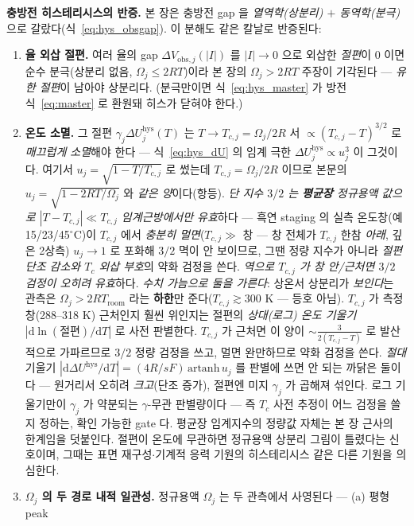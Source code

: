 \documentclass[11pt,a4paper]{article}
\newcommand{\dd}{\mathrm{d}}
\newcommand{\hys}{\mathrm{hys}}
\begin{document}
\textbf{충방전 히스테리시스의 반증.} 본 장은 충방전 gap 을 \emph{열역학(상분리) $+$ 동역학(분극)}으로
갈랐다(식~\eqref{eq:hys_obsgap}). 이 분해도 같은 칼날로 반증된다:
\begin{enumerate}[label=(\roman*),leftmargin=2.0em,itemsep=2pt]
\item \textbf{율 외삽 절편.} 여러 율의 gap $\Delta V_{\mathrm{obs},j}(|I|)$ 를 $|I|\to0$ 으로 외삽한 \emph{절편}이 $0$ 이면
  순수 분극(상분리 없음, $\Omega_j\le2RT$)이라 본 장의 $\Omega_j>2RT$ 주장이 기각된다 — \emph{유한 절편}이 남아야
  상분리다. (분극만이면 식~\eqref{eq:hys_master} 가 방전식~\eqref{eq:master} 로 환원돼 히스가 닫혀야 한다.)
\item \textbf{온도 소멸.} 그 절편 $\gamma_j\Delta U_j^\hys(T)$ 는 $T\to T_{c,j}=\Omega_j/2R$ 서
  $\propto(T_{c,j}-T)^{3/2}$ 로 \emph{매끄럽게 소멸}해야 한다 — 식~\eqref{eq:hys_dU} 의 임계 극한
  $\Delta U_j^\hys\!\propto\!u_j^3$ 이 그것이다. 여기서 $u_j=\sqrt{1-T/T_{c,j}}$ 로 썼는데 $T_{c,j}=\Omega_j/2R$
  이므로 본문의 $u_j=\sqrt{1-2RT/\Omega_j}$ 와 \emph{같은 양}이다(항등). \emph{단 지수 $3/2$ 는 \textbf{평균장} 정규용액 값으로
  $|T-T_{c,j}|\ll T_{c,j}$ 임계근방에서만 유효}하다 — 흑연 staging 의 실측 온도창(예 15/23/45$^\circ$C)이 $T_{c,j}$ 에서
  \emph{충분히 멀면}($T_{c,j}\gg$ 창 — 창 전체가 $T_{c,j}$ 한참 \emph{아래}, 깊은 2상측) $u_j\to1$ 로 포화해 $3/2$ 멱이 안 보이므로, 그땐 정량 지수가 아니라
  \emph{절편 단조 감소와 $T_c$ 외삽 부호}의 약화 검정을 쓴다. \emph{역으로 $T_{c,j}$ 가 창 \emph{안/근처}면 $3/2$ 검정이
  오히려 유효}하다. \emph{수치 가늠으로 둘을 가른다}: 상온서 상분리가 \emph{보인다}는 관측은 $\Omega_j>2RT_{\mathrm{room}}$ 라는
  \textbf{하한}만 준다($T_{c,j}\gtrsim300$ K — 등호 아님). $T_{c,j}$ 가 측정창(288–318 K) 근처인지 훨씬 위인지는
  절편의 \emph{상대(로그) 온도 기울기} $|\dd\ln(\text{절편})/\dd T|$ 로 사전 판별한다. $T_{c,j}$ 가 근처면 이 양이
  $\sim\tfrac{3}{2(T_{c,j}-T)}$ 로 발산적으로 가파르므로 $3/2$ 정량 검정을 쓰고, 멀면 완만하므로 약화 검정을 쓴다.
  \emph{절대} 기울기 $|\dd\Delta U^\hys/\dd T|=(4R/sF)\,\mathrm{artanh}\,u_j$ 를 판별에 쓰면 안 되는 까닭은
  둘이다 — 원거리서 오히려 \emph{크고}(단조 증가), 절편엔 미지 $\gamma_j$ 가 곱해져 섞인다. 로그 기울기만이
  $\gamma_j$ 가 약분되는 $\gamma$-무관 판별량이다 —
  즉 $T_c$ 사전 추정이 어느 검정을 쓸지 정하는, 확인 가능한 gate 다. 평균장 임계지수의 정량값 자체는 본 장
  근사의 한계임을 덧붙인다. 절편이 온도에 무관하면 정규용액 상분리 그림이 틀렸다는 신호이며, 그때는 표면
  재구성$\cdot$기계적 응력 기원의 히스테리시스 같은 다른 기원을 의심한다.
\item \textbf{$\Omega_j$ 의 두 경로 내적 일관성.} 정규용액 $\Omega_j$ 는 두 관측에서 사영된다 — (a) 평형 peak

\end{enumerate}
\end{document}
